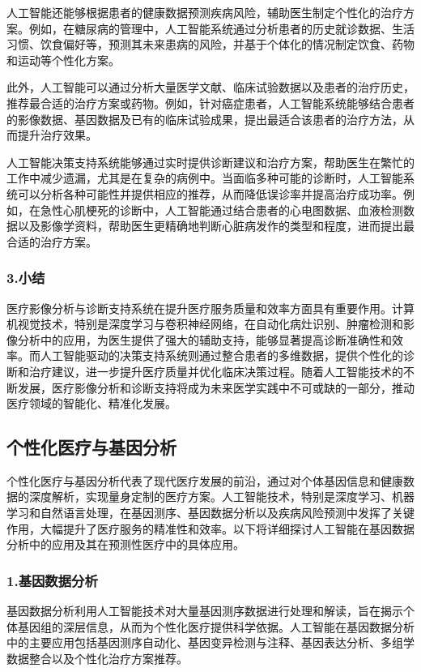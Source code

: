 人工智能还能够根据患者的健康数据预测疾病风险，辅助医生制定个性化的治疗方案。例如，在糖尿病的管理中，人工智能系统通过分析患者的历史就诊数据、生活习惯、饮食偏好等，预测其未来患病的风险，并基于个体化的情况制定饮食、药物和运动等个性化方案。

此外，人工智能可以通过分析大量医学文献、临床试验数据以及患者的治疗历史，推荐最合适的治疗方案或药物。例如，针对癌症患者，人工智能系统能够结合患者的影像数据、基因数据及已有的临床试验成果，提出最适合该患者的治疗方法，从而提升治疗效果。

人工智能决策支持系统能够通过实时提供诊断建议和治疗方案，帮助医生在繁忙的工作中减少遗漏，尤其是在复杂的病例中。当面临多种可能的诊断时，人工智能系统可以分析各种可能性并提供相应的推荐，从而降低误诊率并提高治疗成功率。例如，在急性心肌梗死的诊断中，人工智能通过结合患者的心电图数据、血液检测数据以及影像学资料，帮助医生更精确地判断心脏病发作的类型和程度，进而提出最合适的治疗方案。

\subsubsection{3.小结}

医疗影像分析与诊断支持系统在提升医疗服务质量和效率方面具有重要作用。计算机视觉技术，特别是深度学习与卷积神经网络，在自动化病灶识别、肿瘤检测和影像分析中的应用，为医生提供了强大的辅助支持，能够显著提高诊断准确性和效率。而人工智能驱动的决策支持系统则通过整合患者的多维数据，提供个性化的诊断和治疗建议，进一步提升医疗质量并优化临床决策过程。随着人工智能技术的不断发展，医疗影像分析和诊断支持将成为未来医学实践中不可或缺的一部分，推动医疗领域的智能化、精准化发展。

\subsection{个性化医疗与基因分析}

个性化医疗与基因分析代表了现代医疗发展的前沿，通过对个体基因信息和健康数据的深度解析，实现量身定制的医疗方案。人工智能技术，特别是深度学习、机器学习和自然语言处理，在基因测序、基因数据分析以及疾病风险预测中发挥了关键作用，大幅提升了医疗服务的精准性和效率。以下将详细探讨人工智能在基因数据分析中的应用及其在预测性医疗中的具体应用。

\subsubsection{1.基因数据分析}

基因数据分析利用人工智能技术对大量基因测序数据进行处理和解读，旨在揭示个体基因组的深层信息，从而为个性化医疗提供科学依据。人工智能在基因数据分析中的主要应用包括基因测序自动化、基因变异检测与注释、基因表达分析、多组学数据整合以及个性化治疗方案推荐。

